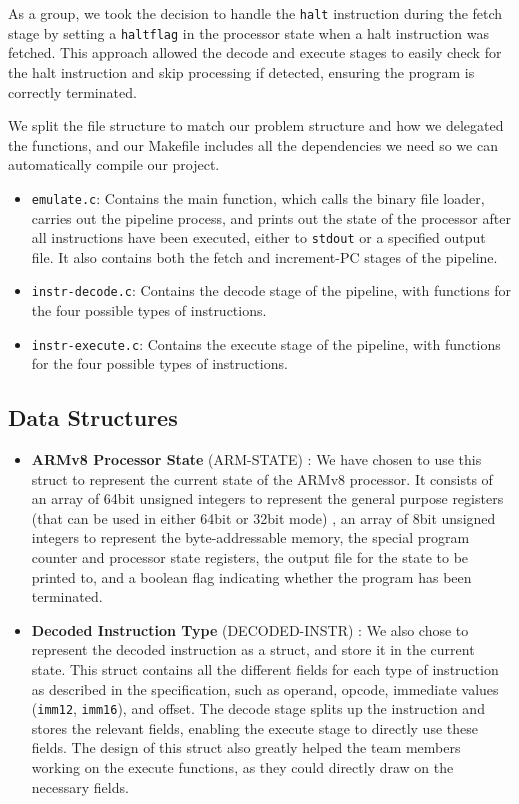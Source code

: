 \documentclass[11pt]{article}
\begin{document}
As a group, we took the decision to handle the \texttt{halt} instruction during the fetch stage by setting a \texttt{haltflag} in the processor state when a halt instruction was fetched. This approach allowed the decode and execute stages to easily check for the halt instruction and skip processing if detected, ensuring the program is correctly terminated.

We split the file structure to match our problem structure and how we delegated the functions, and our Makefile includes all the dependencies we need so we can automatically compile our project.

\begin{itemize}

\item \texttt{emulate.c}: Contains the main function, which calls the binary file loader, carries out the pipeline process, and prints out the state of the processor after all instructions have been executed, either to \texttt{stdout} or a specified output file. It also contains both the fetch and increment-PC stages of the pipeline.
\item \texttt{instr-decode.c}: Contains the decode stage of the pipeline, with functions for the four possible types of instructions.
\item \texttt{instr-execute.c}: Contains the execute stage of the pipeline, with functions for the four possible types of instructions.

\end{itemize}

\subsection{Data Structures}

\begin{itemize}

\item \textbf{ARMv8 Processor State} (ARM-STATE) : We have chosen to use this struct to represent the current state of the ARMv8 processor. It consists of an array of 64bit unsigned integers to represent the general purpose registers (that can be used in either 64bit or 32bit mode) , an array of 8bit unsigned integers to represent the byte-addressable memory, the special program counter and processor state registers, the output file for the state to be printed to, and a boolean flag indicating whether the program has been terminated.
\item \textbf{Decoded Instruction Type} (DECODED-INSTR) : We also chose to represent the decoded instruction as a struct, and store it in the current state. This struct contains all the different fields for each type of instruction as described in the specification, such as operand, opcode, immediate values (\texttt{imm12}, \texttt{imm16}), and offset. The decode stage splits up the instruction and stores the relevant fields, enabling the execute stage to directly use these fields. The design of this struct also greatly helped the team members working on the execute functions, as they could directly draw on the necessary fields.

\end{itemize}
\end{document}
